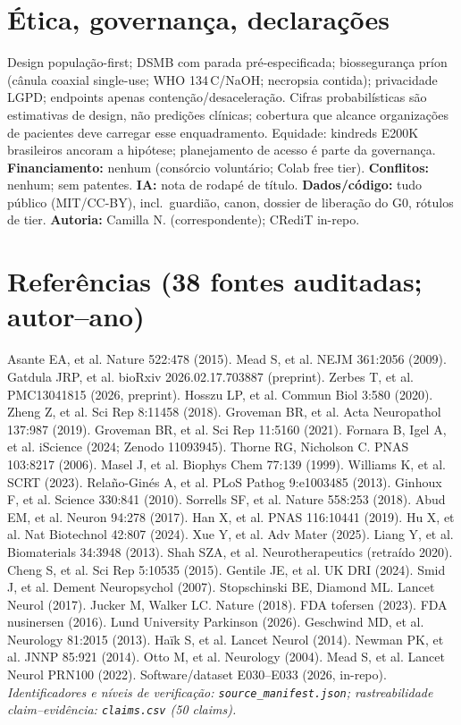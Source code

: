 \documentclass[10pt,twocolumn]{article}
\begin{document}
\section{Ética, governança, declarações}
Design população-first; DSMB com parada pré-especificada; biossegurança príon (cânula coaxial single-use; WHO 134\,\textdegree C/NaOH; necropsia contida); privacidade LGPD; endpoints apenas contenção/desaceleração. Cifras probabilísticas são estimativas de design, não predições clínicas; cobertura que alcance organizações de pacientes deve carregar esse enquadramento. Equidade: kindreds E200K brasileiros ancoram a hipótese; planejamento de acesso é parte da governança. \textbf{Financiamento:} nenhum (consórcio voluntário; Colab free tier). \textbf{Conflitos:} nenhum; sem patentes. \textbf{IA:} nota de rodapé de título. \textbf{Dados/código:} tudo público (MIT/CC-BY), incl.\ guardião, canon, dossier de liberação do G0, rótulos de tier. \textbf{Autoria:} Camilla N. (correspondente); CRediT in-repo.

\section*{Referências (38 fontes auditadas; autor--ano)}
\small
Asante EA, et al. Nature 522:478 (2015). Mead S, et al. NEJM 361:2056 (2009). Gatdula JRP, et al. bioRxiv 2026.02.17.703887 (preprint). Zerbes T, et al. PMC13041815 (2026, preprint). Hosszu LP, et al. Commun Biol 3:580 (2020). Zheng Z, et al. Sci Rep 8:11458 (2018). Groveman BR, et al. Acta Neuropathol 137:987 (2019). Groveman BR, et al. Sci Rep 11:5160 (2021). Fornara B, Igel A, et al. iScience (2024; Zenodo 11093945). Thorne RG, Nicholson C. PNAS 103:8217 (2006). Masel J, et al. Biophys Chem 77:139 (1999). Williams K, et al. SCRT (2023). Rela\~no-Gin\'es A, et al. PLoS Pathog 9:e1003485 (2013). Ginhoux F, et al. Science 330:841 (2010). Sorrells SF, et al. Nature 558:253 (2018). Abud EM, et al. Neuron 94:278 (2017). Han X, et al. PNAS 116:10441 (2019). Hu X, et al. Nat Biotechnol 42:807 (2024). Xue Y, et al. Adv Mater (2025). Liang Y, et al. Biomaterials 34:3948 (2013). Shah SZA, et al. Neurotherapeutics (retraído 2020). Cheng S, et al. Sci Rep 5:10535 (2015). Gentile JE, et al. UK DRI (2024). Smid J, et al. Dement Neuropsychol (2007). Stopschinski BE, Diamond ML. Lancet Neurol (2017). Jucker M, Walker LC. Nature (2018). FDA tofersen (2023). FDA nusinersen (2016). Lund University Parkinson (2026). Geschwind MD, et al. Neurology 81:2015 (2013). Ha\"ik S, et al. Lancet Neurol (2014). Newman PK, et al. JNNP 85:921 (2014). Otto M, et al. Neurology (2004). Mead S, et al. Lancet Neurol PRN100 (2022). Software/dataset E030--E033 (2026, in-repo). \emph{Identificadores e níveis de verificação: \texttt{source\_manifest.json}; rastreabilidade claim--evidência: \texttt{claims.csv} (50 claims).}
\end{document}
